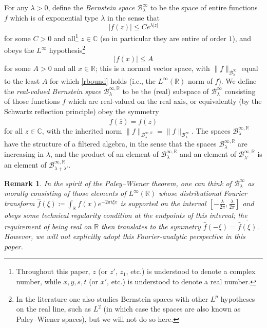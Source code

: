 \documentclass[12pt]{amsart}
\newtheorem{remark}[theorem]{Remark}
\newcommand{\R}{\mathbb{R}}
\newcommand{\C}{\mathbb{C}}
\begin{document}
For any $\lambda>0$, define the \emph{Bernstein space} ${\mathcal B}^\infty_\lambda$ to be the space of entire functions $f$ which is of exponential type $\lambda$ in the sense that
\begin{equation}\label{cbound}
    |f(z)| \leq C e^{\lambda |z|}
\end{equation}
for some $C>0$ and all\footnote{Throughout this paper, $z$ (or $z'$, $z_1$, etc.) is understood to denote a complex number, while $x, y, s, t$ (or $x'$, etc.) is understood to denote a real number.} $z \in \C$ (so in particular they are entire of order $1$), and obeys the $L^\infty$ hypothesis\footnote{In the literature one also studies Bernstein spaces with other $L^p$ hypotheses on the real line, such as $L^2$ (in which case the spaces are also known as Paley--Wiener spaces), but we will not do so here.}
\begin{equation}\label{rbound}
    |f(x)| \leq A
\end{equation}
for some $A>0$ and all $x \in \R$; this is a normed vector space, with $\|f\|_{{\mathcal B}^\infty_\lambda}$ equal to the least $A$ for which \eqref{rbound} holds (i.e., the $L^\infty(\R)$ norm of $f$).  We define the \emph{real-valued Bernstein space} ${\mathcal B}^{\infty,\R}_\lambda$ to be the (real) subspace of ${\mathcal B}^\infty_\lambda$ consisting of those functions $f$ which are real-valued on the real axis, or equivalently (by the Schwartz reflection principle) obey the symmetry
\begin{equation}\label{fsymm}
f(\overline{z}) = \overline{f(z)}
\end{equation}
for all $z \in \C$, with the inherited norm $\|f\|_{{\mathcal B}^{\infty,\R}_\lambda} = \|f\|_{{\mathcal B}^\infty_\lambda}$. The spaces ${\mathcal B}^{\infty,\R}_\lambda$ have the structure of a filtered algebra, in the sense that the spaces ${\mathcal B}^{\infty,\R}_\lambda$ are increasing in $\lambda$, and the product of an element of ${\mathcal B}^{\infty,\R}_\lambda$ and an element of ${\mathcal B}^{\infty,\R}_{\lambda'}$ is an element of ${\mathcal B}^{\infty,\R}_{\lambda+\lambda'}$.

\begin{remark}
In the spirit of the Paley--Wiener theorem, one can think of ${\mathcal B}^\infty_\lambda$ as morally consisting of those elements of $L^\infty(\R)$ whose distributional Fourier transform $\hat f(\xi) \coloneqq \int_\R f(x) e^{-2\pi i \xi x}$ is supported on the interval $[-\frac{\lambda}{2\pi}, \frac{\lambda}{2\pi}]$ and obeys some technical regularity condition at the endpoints of this interval; the requirement of being real on $\R$ then translates to the symmetry $\hat f(-\xi) = \overline{\hat f(\xi)}$.  However, we will not explicitly adopt this Fourier-analytic perspective in this paper.
\end{remark}
\end{document}
